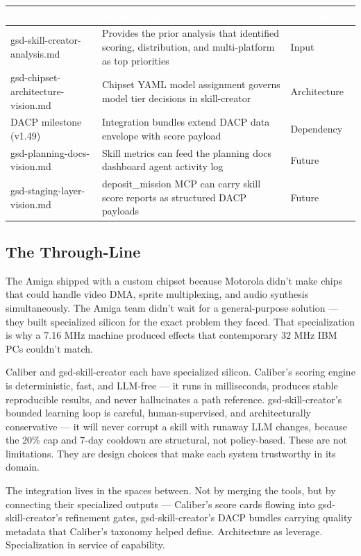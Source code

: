 \documentclass[11pt,letterpaper]{article}
\newcommand{\tableheader}[1]{\textbf{\sffamily\textcolor{white}{#1}}}
\begin{document}
\begin{center}
\begin{tabularx}{\textwidth}{L{3.5cm}XC{2.2cm}}
\toprule
{}
\tableheader{Document} & \tableheader{Relationship} & \tableheader{Dependency} \\
\midrule
gsd-skill-creator-analysis.md & Provides the prior analysis that identified scoring, distribution, and multi-platform as top priorities & Input \\
gsd-chipset-architecture-vision.md & Chipset YAML model assignment governs model tier decisions in skill-creator & Architecture \\
DACP milestone (v1.49) & Integration bundles extend DACP data envelope with score payload & Dependency \\
gsd-planning-docs-vision.md & Skill metrics can feed the planning docs dashboard agent activity log & Future \\
gsd-staging-layer-vision.md & deposit\_mission MCP can carry skill score reports as structured DACP payloads & Future \\
\bottomrule
\end{tabularx}
\end{center}

\subsection{The Through-Line}

The Amiga shipped with a custom chipset because Motorola didn't make chips that could handle video DMA, sprite multiplexing, and audio synthesis simultaneously. The Amiga team didn't wait for a general-purpose solution — they built specialized silicon for the exact problem they faced. That specialization is why a 7.16 MHz machine produced effects that contemporary 32 MHz IBM PCs couldn't match.

Caliber and gsd-skill-creator each have specialized silicon. Caliber's scoring engine is deterministic, fast, and LLM-free — it runs in milliseconds, produces stable reproducible results, and never hallucinates a path reference. gsd-skill-creator's bounded learning loop is careful, human-supervised, and architecturally conservative — it will never corrupt a skill with runaway LLM changes, because the 20\% cap and 7-day cooldown are structural, not policy-based. These are not limitations. They are design choices that make each system trustworthy in its domain.

The integration lives in the spaces between. Not by merging the tools, but by connecting their specialized outputs — Caliber's score cards flowing into gsd-skill-creator's refinement gates, gsd-skill-creator's DACP bundles carrying quality metadata that Caliber's taxonomy helped define. Architecture as leverage. Specialization in service of capability.
\end{document}
